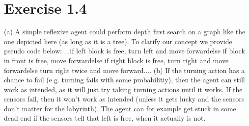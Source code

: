 \documentclass[12pt]{article}
\begin{document}
\section*{Exercise 1.4}

(a) A simple reflexive agent could perform depth first search on a graph like the one depicted here (as long as it is a tree). To clarify our concept we provide pseudo code below: \newline ...\newline if left block is free,\newline \hspace*{10mm} turn left and move forward\newline else if block in front is free,\newline \hspace*{10mm} move forward\newline else if right block is free,\newline \hspace*{10mm} turn right and move forward\newline else\newline \hspace*{10mm} turn right twice and move forward.\newline ...
\newline \newline
(b) If the turning action has a chance to fail (e.g. turning fails with some probabilitiy), then the agent can still work as intended, as it will just try taking turning actions until it works. If the sensors fail, then it won't work as intended (unless it gets lucky and the sensors don't matter for the labyrinth). The agent can for example get stuck in some dead end if the sensors tell that left is free, when it actually is not.
\end{document}
